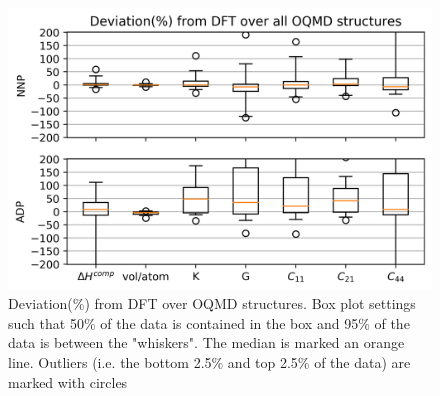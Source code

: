\documentclass{article}
\begin{document}
\begin{figure}[H]%
\centering%
\includegraphics[width=540px]{./figures/bulk_boxplot.png}%
\caption{Deviation(\%) from DFT over OQMD structures. Box plot settings such that 50\% of the data is contained in the box and 95\% of the data is between the "whiskers". The median is marked an orange line. Outliers (i.e. the bottom 2.5\% and top 2.5\% of the data) are marked with circles}%
\end{figure}

%
\end{document}
